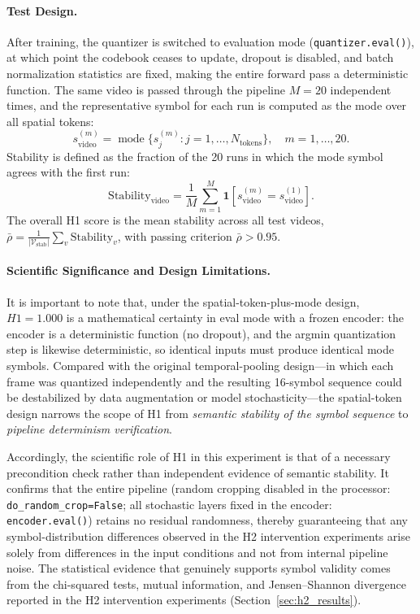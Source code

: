 \documentclass{article}
\begin{document}
\paragraph{Test Design.}
After training, the quantizer is switched to evaluation mode
(\texttt{quantizer.eval()}), at which point the codebook ceases to update,
dropout is disabled, and batch normalization statistics are fixed, making the
entire forward pass a deterministic function.  The same video is passed through
the pipeline $M = 20$ independent times, and the representative symbol for each
run is computed as the mode over all spatial tokens:
%
\begin{equation}
  s_{\text{video}}^{(m)}
  = \operatorname{mode}\bigl\{s_j^{(m)} : j = 1, \ldots, N_{\text{tokens}}\bigr\},
  \quad m = 1, \ldots, 20.
\end{equation}
%
Stability is defined as the fraction of the 20 runs in which the mode symbol
agrees with the first run:
%
\begin{equation}
  \text{Stability}_{\text{video}}
  = \frac{1}{M}\sum_{m=1}^{M}
    \mathbf{1}\!\left[s_{\text{video}}^{(m)} = s_{\text{video}}^{(1)}\right].
\end{equation}
%
The overall H1 score is the mean stability across all test videos,
$\bar{\rho} = \frac{1}{|\mathcal{V}_{\text{stab}}|}\sum_{v}\text{Stability}_v$,
with passing criterion $\bar{\rho} > 0.95$.

\paragraph{Scientific Significance and Design Limitations.}
It is important to note that, under the spatial-token-plus-mode design, $H1 =
1.000$ is a mathematical certainty in eval mode with a frozen encoder: the
encoder is a deterministic function (no dropout), and the argmin quantization
step is likewise deterministic, so identical inputs must produce identical mode
symbols.  Compared with the original temporal-pooling design---in which each
frame was quantized independently and the resulting 16-symbol sequence could be
destabilized by data augmentation or model stochasticity---the spatial-token
design narrows the scope of H1 from \emph{semantic stability of the symbol
sequence} to \emph{pipeline determinism verification}.

Accordingly, the scientific role of H1 in this experiment is that of a
necessary precondition check rather than independent evidence of semantic
stability.  It confirms that the entire pipeline (random cropping disabled in
the processor: \texttt{do\_random\_crop=False}; all stochastic layers fixed in
the encoder: \texttt{encoder.eval()}) retains no residual randomness, thereby
guaranteeing that any symbol-distribution differences observed in the H2
intervention experiments arise solely from differences in the input conditions
and not from internal pipeline noise.  The statistical evidence that genuinely
supports symbol validity comes from the chi-squared tests, mutual information,
and Jensen--Shannon divergence reported in the H2 intervention experiments
(Section~\ref{sec:h2_results}).
\end{document}

